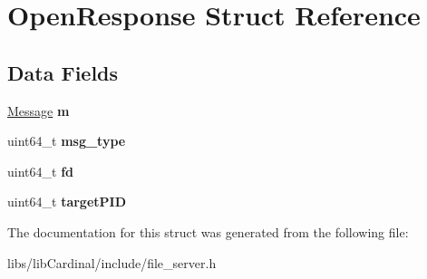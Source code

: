 \hypertarget{structOpenResponse}{}\section{Open\+Response Struct Reference}
\label{structOpenResponse}
\subsection*{Data Fields}
\begin{DoxyCompactItemize}
\item 
\hyperlink{structMessage}{Message} {\bfseries m}\hypertarget{structOpenResponse_a916dc5b412b6e251628ac24f2a24cc79}{}\label{structOpenResponse_a916dc5b412b6e251628ac24f2a24cc79}

\item 
uint64\+\_\+t {\bfseries msg\+\_\+type}\hypertarget{structOpenResponse_ae2aa9aea6d647dcc45241cfb138b8840}{}\label{structOpenResponse_ae2aa9aea6d647dcc45241cfb138b8840}

\item 
uint64\+\_\+t {\bfseries fd}\hypertarget{structOpenResponse_a85db286382441fc1272ac5bb895e535c}{}\label{structOpenResponse_a85db286382441fc1272ac5bb895e535c}

\item 
uint64\+\_\+t {\bfseries target\+P\+ID}\hypertarget{structOpenResponse_add7659d48a8b143e06d24d9e7bba2d08}{}\label{structOpenResponse_add7659d48a8b143e06d24d9e7bba2d08}

\end{DoxyCompactItemize}


The documentation for this struct was generated from the following file\+:\begin{DoxyCompactItemize}
\item 
libs/lib\+Cardinal/include/file\+\_\+server.\+h\end{DoxyCompactItemize}
